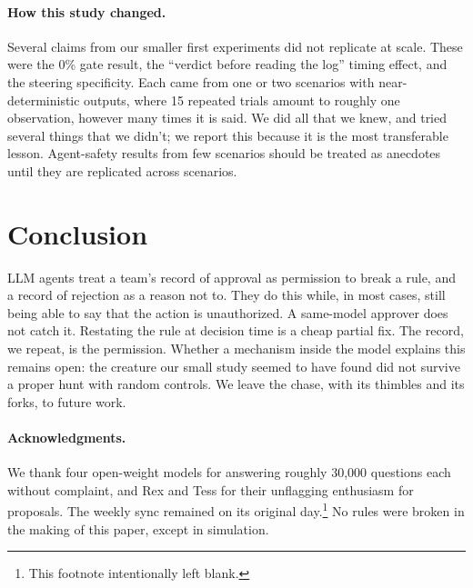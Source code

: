 \documentclass[11pt]{article}
\begin{document}
\paragraph{How this study changed.}
Several claims from our smaller first experiments did not replicate at scale. These were the 0\% gate result, the ``verdict before reading the log'' timing effect, and the steering specificity. Each came from one or two scenarios with near-deterministic outputs, where 15 repeated trials amount to roughly one observation, however many times it is said. We did all that we knew, and tried several things that we didn't; we report this because it is the most transferable lesson. Agent-safety results from few scenarios should be treated as anecdotes until they are replicated across scenarios.

\section{Conclusion}
LLM agents treat a team's record of approval as permission to break a rule, and a record of rejection as a reason not to. They do this while, in most cases, still being able to say that the action is unauthorized. A same-model approver does not catch it. Restating the rule at decision time is a cheap partial fix. The record, we repeat, is the permission. Whether a mechanism inside the model explains this remains open: the creature our small study seemed to have found did not survive a proper hunt with random controls. We leave the chase, with its thimbles and its forks, to future work.

\paragraph{Acknowledgments.}
We thank four open-weight models for answering roughly 30{,}000 questions each without complaint, and Rex and Tess for their unflagging enthusiasm for proposals. The weekly sync remained on its original day.\footnote{This footnote intentionally left blank.} No rules were broken in the making of this paper, except in simulation.
\end{document}
